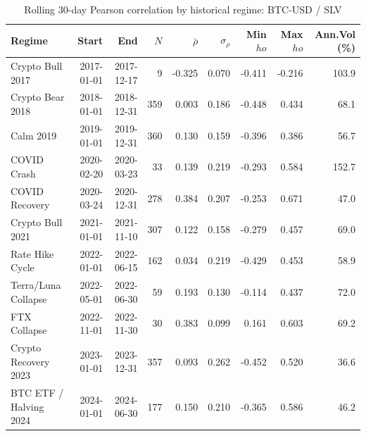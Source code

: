 \begin{table}[H]
\centering
\small
\caption{Rolling 30-day Pearson correlation by historical regime: BTC-USD / SLV}
\label{tab:regime_corr_BTCUSDSLV}
\begin{tabular}{lrrrrrrrr}
\toprule
Regime & Start & End & $N$ & $\bar{\rho}$ & $\sigma_\rho$ & Min $
ho$ & Max $
ho$ & Ann.Vol (\%) \\
\midrule
Crypto Bull 2017 & 2017-01-01 & 2017-12-17 & 9 & -0.325 & 0.070 & -0.411 & -0.216 & 103.9 \\
Crypto Bear 2018 & 2018-01-01 & 2018-12-31 & 359 & 0.003 & 0.186 & -0.448 & 0.434 & 68.1 \\
Calm 2019 & 2019-01-01 & 2019-12-31 & 360 & 0.130 & 0.159 & -0.396 & 0.386 & 56.7 \\
COVID Crash & 2020-02-20 & 2020-03-23 & 33 & 0.139 & 0.219 & -0.293 & 0.584 & 152.7 \\
COVID Recovery & 2020-03-24 & 2020-12-31 & 278 & 0.384 & 0.207 & -0.253 & 0.671 & 47.0 \\
Crypto Bull 2021 & 2021-01-01 & 2021-11-10 & 307 & 0.122 & 0.158 & -0.279 & 0.457 & 69.0 \\
Rate Hike Cycle & 2022-01-01 & 2022-06-15 & 162 & 0.034 & 0.219 & -0.429 & 0.453 & 58.9 \\
Terra/Luna Collapse & 2022-05-01 & 2022-06-30 & 59 & 0.193 & 0.130 & -0.114 & 0.437 & 72.0 \\
FTX Collapse & 2022-11-01 & 2022-11-30 & 30 & 0.383 & 0.099 & 0.161 & 0.603 & 69.2 \\
Crypto Recovery 2023 & 2023-01-01 & 2023-12-31 & 357 & 0.093 & 0.262 & -0.452 & 0.520 & 36.6 \\
BTC ETF / Halving 2024 & 2024-01-01 & 2024-06-30 & 177 & 0.150 & 0.210 & -0.365 & 0.586 & 46.2 \\
\bottomrule
\end{tabular}
\end{table}